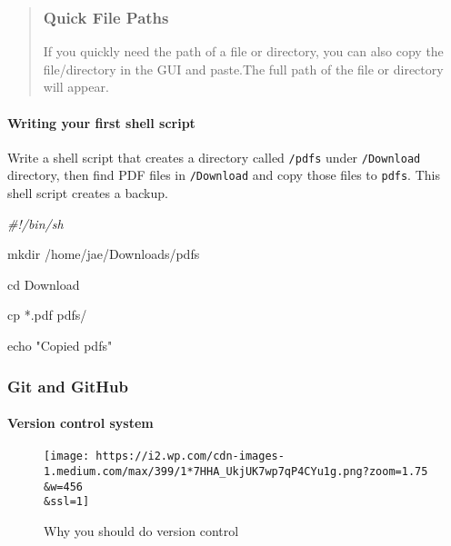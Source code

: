 \documentclass[
]{book}
\newenvironment{Shaded}{\begin{snugshade}}{\end{snugshade}}
\newcommand{\BuiltInTok}[1]{#1}
\newcommand{\CommentTok}[1]{\textcolor[rgb]{0.56,0.35,0.01}{\textit{#1}}}
\newcommand{\FunctionTok}[1]{\textcolor[rgb]{0.00,0.00,0.00}{#1}}
\newcommand{\NormalTok}[1]{#1}
\newcommand{\StringTok}[1]{\textcolor[rgb]{0.31,0.60,0.02}{#1}}
\begin{document}
\begin{quote}
\hypertarget{quick-file-paths}{%
\subsubsection{Quick File Paths}\label{quick-file-paths}}

If you quickly need the path of a file or directory, you can also copy the
file/directory in the GUI and paste.The full path of the file or directory
will appear.
\end{quote}

\hypertarget{writing-your-first-shell-script}{%
\paragraph{Writing your first shell script}\label{writing-your-first-shell-script}}

Write a shell script that creates a directory called \texttt{/pdfs} under \texttt{/Download} directory, then find PDF files in \texttt{/Download} and copy those files to \texttt{pdfs}. This shell script creates a backup.

\begin{Shaded}
\begin{Highlighting}[]

\CommentTok{\#!/bin/sh}

\FunctionTok{mkdir}\NormalTok{ /home/jae/Downloads/pdfs }

\BuiltInTok{cd}\NormalTok{ Download}

\FunctionTok{cp}\NormalTok{ *.pdf pdfs/ }

\BuiltInTok{echo} \StringTok{"Copied pdfs"}
\end{Highlighting}
\end{Shaded}

\hypertarget{git-and-github}{%
\subsubsection{Git and GitHub}\label{git-and-github}}

\hypertarget{version-control-system}{%
\paragraph{Version control system}\label{version-control-system}}

\begin{figure}
\centering
\texttt{[image: https://i2.wp.com/cdn-images-1.medium.com/max/399/1*7HHA\_UkjUK7wp7qP4CYu1g.png?zoom=1.75\\\&w=456\\\&ssl=1]}
\caption{Why you should do version control}
\end{figure}
\end{document}
